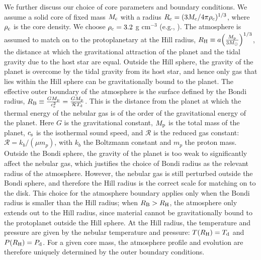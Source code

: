 \documentclass[apj]{emulateapj}
\newcommand{\di}{_{\rm d}}
\begin{document}
We further discuss our choice of core parameters and boundary conditions. We assume a solid core of fixed mass $M_{\rm c}$ with a radius $R_{\rm c}=(3 M_{\rm c}/4 \pi \rho_{\rm c})^{1/3}$, where $\rho_{\rm c}$ is the core density. We choose $\rho_{\rm c}=3.2$ g cm$^{-3}$ (e.g., \citealt{pap99}). The atmosphere is assumed to match on to the protoplanetary at the Hill radius, $R_{\rm H} \equiv a \Big(\frac{M_{\rm p}}{3 M_{\odot}}\Big)^{1/3}$, the distance at which the gravitational attraction of the planet and the tidal gravity due to the host star are equal. Outside the Hill sphere, the gravity of the planet is overcome by the tidal gravity from its host star, and hence only gas that lies within the Hill sphere can be gravitationally bound to the planet. The effective outer boundary of the atmosphere is the surface defined by the Bondi radius, $R_{\rm B} \equiv \frac{G M_{\rm p}}{c_{\rm s}^2}=\frac{G M_{\rm p}}{\mathcal{R} T\di}$. This is the distance from the planet at which the thermal energy of the nebular gas is of the order of the gravitational energy of the planet. Here $G$ is the gravitational constant, $M_{\rm p}$ is the total mass of the planet, $c_{\rm s}$ is the isothermal sound speed, and $\mathcal{R}$ is the reduced gas constant: $\mathcal{R}=k_b/(\mu m_p)$, with $k_b$ the Boltzmann constant and $m_p$ the proton mass. Outside the Bondi sphere, the gravity of the planet is too weak to significantly affect the nebular gas, which justifies the choice of Bondi radius as the relevant radius of the atmosphere. However, the nebular gas is still perturbed outside the Bondi sphere, and therefore the Hill radius is the correct scale for matching on to the disk. This choice for the atmosphere boundary applies only when the Bondi radius is smaller than the Hill radius; when $R_{\rm B}>R_{\rm H}$, the atmosphere only extends out to the Hill radius, since material cannot be gravitationally bound to the protoplanet outside the Hill sphere. At the Hill radius, the temperature and pressure are given by the nebular temperature and pressure: $T(R_{\rm H})=T_{\rm d}$ and $P(R_{\rm H})=P_{\rm d}$. For a given core mass, the atmosphere profile and evolution are therefore uniquely determined by the outer boundary conditions. 



\end{document}
